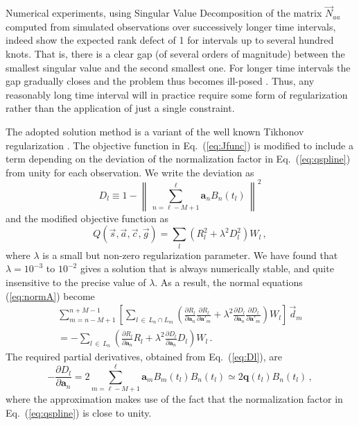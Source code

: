 \documentclass[structabstract]{aa}
\newcommand{\quat}[1]{\mathbf{#1}}
\begin{document}
Numerical experiments, using Singular Value De\-com\-po\-si\-tion
\citep[SVD; see, e.g.,][]{golu+96} of the
matrix $\vec{N}_{aa}$ computed from simulated observations over successively
longer time intervals, indeed show the expected rank defect of 1 for intervals
up to several hundred knots. That is, there is a clear gap (of several orders
of magnitude) between the smallest singular value and the second smallest one.
For longer time intervals the gap gradually closes and the problem thus
becomes ill-posed \citep{book:hansen1998}. Thus, any reasonably long time
interval will in practice require some form of regularization rather than
the application of just a single constraint.

The adopted solution method is a variant of the well known Tikhonov
regularization \citep{book:hansen1998}. The objective function
in Eq.~(\ref{eq:Jfunc}) is modified to include a term depending on the
deviation of the normalization factor in Eq.~(\ref{eq:qspline}) from unity
for each observation. We write the deviation as
\begin{equation}\label{eq:Dl}
 D_l \equiv 1 - \left\|\, \sum_{n=\ell-M+1}^{\ell} \quat{a}_n B_n(t_l)\,\right\|^2
\end{equation}
and the modified objective function as
\begin{equation}\label{eq:JfuncMod}
Q(\vec{s},\vec{a},\vec{c},\vec{g}) =
\sum_{l} \left( R_l^2 + \lambda^2 D_l^2\right) W_l\, ,
\end{equation}
where $\lambda$ is a small but non-zero regularization parameter. We have found that
$\lambda = 10^{-3}$ to $10^{-2}$ gives a solution that is always numerically stable,
and quite insensitive to the precise value of $\lambda$. As a result,
the normal equations (\ref{eq:normA}) become
\begin{multline} \label{eq:normAmod}
\sum_{m=n-M+1}^{n+M-1}
\left[ \sum_{l\,\in\, L_n\cap L_m} \left(
\frac{\partial R_l}{\partial\quat{a}_n}\frac{\partial R_l}{\partial\quat{a}'_{\!m}}
+ \lambda^2
\frac{\partial D_l}{\partial\quat{a}_n}\frac{\partial D_l}{\partial\quat{a}'_{\!m}}
\right)W_l \right]\,\vec{d}_m \\
= -\sum_{l\,\in\, L_n} \left(
\frac{\partial R_l}{\partial\quat{a}_n}R_l + \lambda^2
\frac{\partial D_l}{\partial\quat{a}_n}D_l \right)W_l \, .
\end{multline}
The required partial derivatives, obtained from Eq.~(\ref{eq:Dl}), are
\begin{equation}\label{eq:dDldan}
-\frac{\partial D_l}{\partial\quat{a}_n} =
2\!\!\!\sum_{m=\ell-M+1}^{\ell}\!\quat{a}_m B_m(t_l) B_n(t_l)
\simeq 2\quat{q}(t_l)B_n(t_l) \, ,
\end{equation}
where the approximation makes use of the fact that the normalization
factor in Eq.~(\ref{eq:qspline}) is close to unity.
\end{document}

